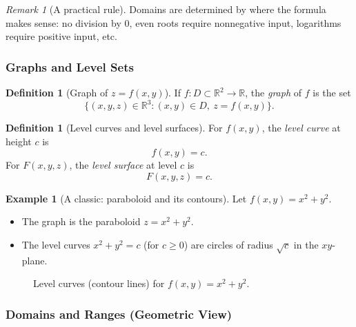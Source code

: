 \documentclass[12pt]{article}
\numberwithin{equation}{section}
\newcommand{\RR}{\mathbb{R}}
\theoremstyle{plain}
\theoremstyle{definition}
\newtheorem{definition}[theorem]{Definition}
\newtheorem{example}[theorem]{Example}
\theoremstyle{remark}
\newtheorem{remark}[theorem]{Remark}
\begin{document}
\begin{remark}[A practical rule]
Domains are determined by where the formula makes sense: no division by $0$, even roots require nonnegative input, logarithms require positive input, etc.
\end{remark}

\subsubsection{Graphs and Level Sets}

\begin{definition}[Graph of $z=f(x,y)$]
If $f:D\subset\RR^2\to\RR$, the \emph{graph} of $f$ is the set
\[
\{(x,y,z)\in\RR^3: (x,y)\in D,\ z=f(x,y)\}.
\]
\end{definition}

\begin{definition}[Level curves and level surfaces]
For $f(x,y)$, the \emph{level curve} at height $c$ is
\[
f(x,y)=c.
\]
For $F(x,y,z)$, the \emph{level surface} at level $c$ is
\[
F(x,y,z)=c.
\]
\end{definition}

\begin{example}[A classic: paraboloid and its contours]
Let $f(x,y)=x^2+y^2$.  
\begin{itemize}
\item The graph is the paraboloid $z=x^2+y^2$.
\item The level curves $x^2+y^2=c$ (for $c\ge 0$) are circles of radius $\sqrt{c}$ in the $xy$-plane.
\end{itemize}
\end{example}

\begin{figure}[H]
\centering
{}
\caption{Level curves (contour lines) for $f(x,y)=x^2+y^2$.}
\label{fig:levelcurves}
\end{figure}

\subsubsection{Domains and Ranges (Geometric View)}
\end{document}
